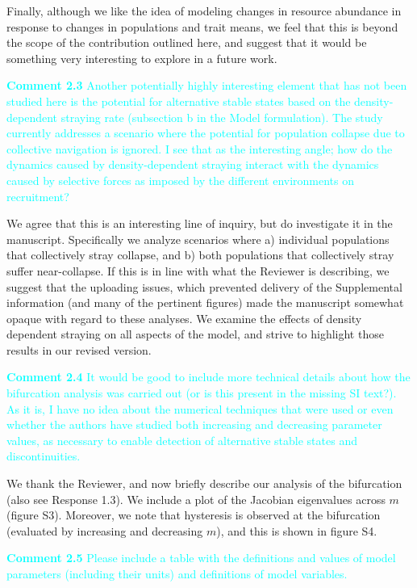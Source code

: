 \documentclass[ucm,12pt]{ucletter}
\newcounter{section}
\newcounter{subsection}[section]
\begin{document}
\begin{letter}
Finally, although we like the idea of modeling changes in resource abundance in response to changes in populations and trait means, we feel that this is beyond the scope of the contribution outlined here, and suggest that it would be something very interesting to explore in a future work.

\noindent \textcolor{cyan}{
{\bf Comment 2.3} Another potentially highly interesting element that has not been studied here is the potential for alternative stable states based on the density-dependent straying rate (subsection b in the Model formulation). The study currently addresses a scenario where the potential for population collapse due to collective navigation is ignored. I see that as the interesting angle; how do the dynamics caused by density-dependent straying interact with the dynamics caused by selective forces as imposed by the different environments on recruitment?
}

 We agree that this is an interesting line of inquiry, but do investigate it in the manuscript. Specifically we analyze scenarios where a) individual populations that collectively stray collapse, and b) both populations that collectively stray suffer near-collapse. If this is in line with what the Reviewer is describing, we suggest that the uploading issues, which prevented delivery of the Supplemental information (and many of the pertinent figures) made the manuscript somewhat opaque with regard to these analyses. We examine the effects of density dependent straying on all aspects of the model, and strive to highlight those results in our revised version.

\noindent \textcolor{cyan}{
{\bf Comment 2.4} It would be good to include more technical details about how the bifurcation analysis was carried out (or is this present in the missing SI text?). As it is, I have no idea about the numerical techniques that were used or even whether the authors have studied both increasing and decreasing parameter values, as necessary to enable detection of alternative stable states and discontinuities.
}

 We thank the Reviewer, and now briefly describe our analysis of the bifurcation (also see Response 1.3). We include a plot of the Jacobian eigenvalues across $m$ (figure S3). Moreover, we note that hysteresis is observed at the bifurcation (evaluated by increasing and decreasing $m$), and this is shown in figure S4.

\noindent \textcolor{cyan}{
{\bf Comment 2.5} Please include a table with the definitions and values of model parameters (including their units) and definitions of model variables.
}


\end{letter}
\end{document}
